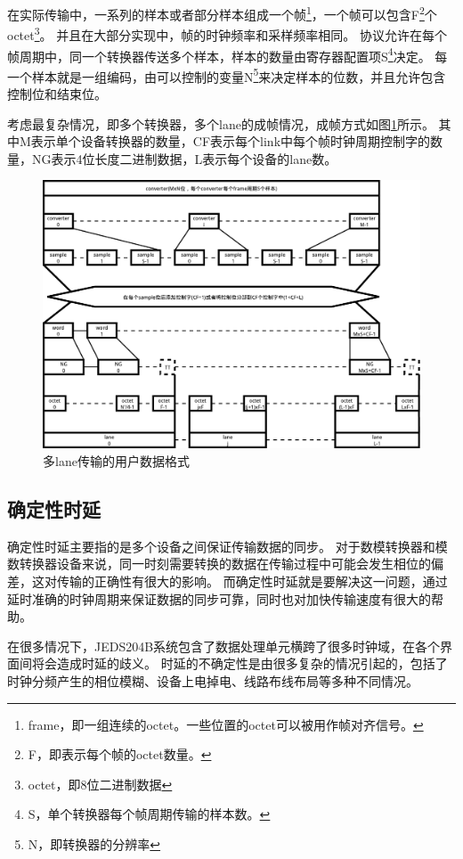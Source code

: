 \documentclass[UTF8]{ctexart}
\begin{document}
在实际传输中，一系列的样本或者部分样本组成一个帧\footnote{frame，即一组连续的octet。一些位置的octet可以被用作帧对齐信号。}，一个帧可以包含F\footnote{F，即表示每个帧的octet数量。}个octet\footnote{octet，即8位二进制数据}。
并且在大部分实现中，帧的时钟频率和采样频率相同。
协议允许在每个帧周期中，同一个转换器传送多个样本，样本的数量由寄存器配置项S\footnote{S，单个转换器每个帧周期传输的样本数。}决定。
每一个样本就是一组编码，由可以控制的变量N\footnote{N，即转换器的分辨率}来决定样本的位数，并且允许包含控制位和结束位。

考虑最复杂情况，即多个转换器，多个lane的成帧情况，成帧方式如图\ref{fig:user_data_format_for_multiple_lanes}所示。
其中M表示单个设备转换器的数量，CF表示每个link中每个帧时钟周期控制字的数量，NG表示4位长度二进制数据，L表示每个设备的lane数。

\begin{figure}[H]
\centering
\includegraphics[width=17cm]{./img/user_data_format_for_multiple_lanes.pdf}
\caption{多lane传输的用户数据格式}
\label{fig:user_data_format_for_multiple_lanes}
\end{figure}

\subsection{确定性时延}

确定性时延主要指的是多个设备之间保证传输数据的同步。
对于数模转换器和模数转换器设备来说，同一时刻需要转换的数据在传输过程中可能会发生相位的偏差，这对传输的正确性有很大的影响。
而确定性时延就是要解决这一问题，通过延时准确的时钟周期来保证数据的同步可靠，同时也对加快传输速度有很大的帮助。

在很多情况下，JEDS204B系统包含了数据处理单元横跨了很多时钟域，在各个界面间将会造成时延的歧义。
时延的不确定性是由很多复杂的情况引起的，包括了时钟分频产生的相位模糊、设备上电掉电、线路布线布局等多种不同情况。
\end{document}
